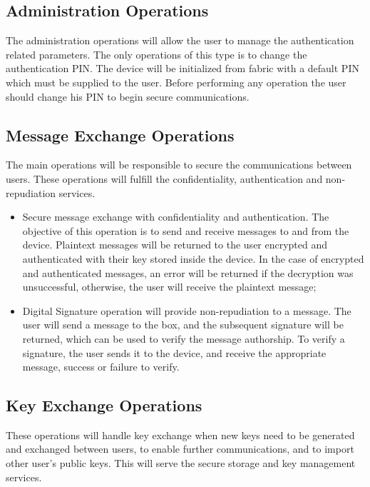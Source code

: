 \subsection{Administration Operations} \label{chap:arch:ops:administration}

The administration operations will allow the user to manage the authentication related parameters.
The only operations of this type is to change the authentication PIN. The device will be initialized from fabric with a default PIN which must be supplied to the user. Before performing any operation the user should change his PIN to begin secure communications.

\subsection{Message Exchange Operations}  \label{chap:arch:ops:message}

The main operations will be responsible to secure the communications between users. These operations will fulfill the confidentiality, authentication and non-repudiation services.

\begin{itemize}
    \item Secure message exchange with confidentiality and authentication. The objective of this operation is to send and receive messages to and from the device. Plaintext messages will be returned to the user encrypted and authenticated with their key stored inside the device. In the case of encrypted and authenticated messages, an error will be returned if the decryption was unsuccessful, otherwise, the user will receive the plaintext message;
    \item Digital Signature operation will provide non-repudiation to a message. The user will send a message to the box, and the subsequent signature will be returned, which can be used to verify the message authorship. To verify a signature, the user sends it to the device, and receive the appropriate message, success or failure to verify.
\end{itemize}

\subsection{Key Exchange Operations}  \label{chap:arch:ops:key}

These operations will handle key exchange when new keys need to be generated and exchanged between users, to enable further communications, and to import other user's public keys. This will serve the secure storage and key management services.

